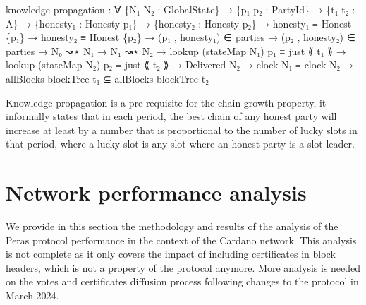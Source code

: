 \documentclass[10pt]{article}
\newenvironment{Shaded}{}{}
\newcommand{\NormalTok}[1]{#1}
\newcommand{\OtherTok}[1]{\textcolor[rgb]{0.00,0.44,0.13}{#1}}
\begin{document}
\begin{Shaded}
\begin{Highlighting}[]
\NormalTok{    knowledge{-}propagation }\OtherTok{:} \OtherTok{∀} \OtherTok{\{}\NormalTok{N₁ N₂ }\OtherTok{:}\NormalTok{ GlobalState}\OtherTok{\}}
      \OtherTok{→} \OtherTok{\{}\NormalTok{p₁ p₂ }\OtherTok{:}\NormalTok{ PartyId}\OtherTok{\}}
      \OtherTok{→} \OtherTok{\{}\NormalTok{t₁ t₂ }\OtherTok{:}\NormalTok{ A}\OtherTok{\}}
      \OtherTok{→} \OtherTok{\{}\NormalTok{honesty₁ }\OtherTok{:}\NormalTok{ Honesty p₁}\OtherTok{\}}
      \OtherTok{→} \OtherTok{\{}\NormalTok{honesty₂ }\OtherTok{:}\NormalTok{ Honesty p₂}\OtherTok{\}}
      \OtherTok{→}\NormalTok{ honesty₁ ≡ Honest }\OtherTok{\{}\NormalTok{p₁}\OtherTok{\}}
      \OtherTok{→}\NormalTok{ honesty₂ ≡ Honest }\OtherTok{\{}\NormalTok{p₂}\OtherTok{\}}
      \OtherTok{→} \OtherTok{(}\NormalTok{p₁ , honesty₁}\OtherTok{)}\NormalTok{ ∈ parties}
      \OtherTok{→} \OtherTok{(}\NormalTok{p₂ , honesty₂}\OtherTok{)}\NormalTok{ ∈ parties}
      \OtherTok{→}\NormalTok{ N₀ ↝⋆ N₁}
      \OtherTok{→}\NormalTok{ N₁ ↝⋆ N₂}
      \OtherTok{→}\NormalTok{ lookup }\OtherTok{(}\NormalTok{stateMap N₁}\OtherTok{)}\NormalTok{ p₁ ≡ just ⟪ t₁ ⟫}
      \OtherTok{→}\NormalTok{ lookup }\OtherTok{(}\NormalTok{stateMap N₂}\OtherTok{)}\NormalTok{ p₂ ≡ just ⟪ t₂ ⟫}
      \OtherTok{→}\NormalTok{ Delivered N₂}
      \OtherTok{→}\NormalTok{ clock N₁ ≡ clock N₂}
      \OtherTok{→}\NormalTok{ allBlocks blockTree t₁ ⊆ allBlocks blockTree t₂}
\end{Highlighting}
\end{Shaded}

Knowledge propagation is a pre-requisite for the chain growth property,
it informally states that in each period, the best chain of any honest
party will increase at least by a number that is proportional to the
number of lucky slots in that period, where a lucky slot is any slot
where an honest party is a slot leader.

\section{Network performance
analysis}\label{network-performance-analysis}

We provide in this section the methodology and results of the analysis
of the Peras protocol performance in the context of the Cardano network.
This analysis is not complete as it only covers the impact of including
certificates in block headers, which is not a property of the protocol
anymore. More analysis is needed on the votes and certificates diffusion
process following changes to the protocol in March 2024.
\end{document}
